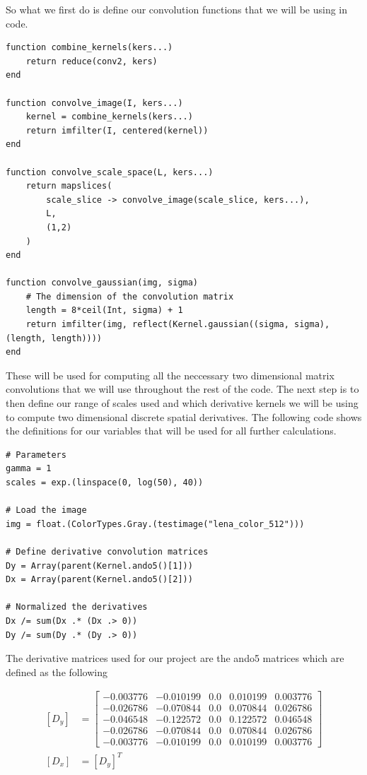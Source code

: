 \documentclass{article}
\begin{document}
So what we first do is define our convolution functions that we will be using in code.

\begin{lstlisting}
function combine_kernels(kers...)
    return reduce(conv2, kers)
end

function convolve_image(I, kers...)
    kernel = combine_kernels(kers...)
    return imfilter(I, centered(kernel))
end

function convolve_scale_space(L, kers...)
    return mapslices(
        scale_slice -> convolve_image(scale_slice, kers...),
        L,
        (1,2)
    )
end

function convolve_gaussian(img, sigma)
    # The dimension of the convolution matrix
    length = 8*ceil(Int, sigma) + 1
    return imfilter(img, reflect(Kernel.gaussian((sigma, sigma), (length, length))))
end
\end{lstlisting}

These will be used for computing all the neccessary two dimensional matrix convolutions that we will use throughout the rest of the code.
The next step is to then define our range of scales used and which derivative kernels we will be using to compute two dimensional discrete spatial derivatives.
The following code shows the definitions for our variables that will be used for all further calculations. 

\begin{lstlisting}
# Parameters
gamma = 1
scales = exp.(linspace(0, log(50), 40))

# Load the image
img = float.(ColorTypes.Gray.(testimage("lena_color_512")))

# Define derivative convolution matrices
Dy = Array(parent(Kernel.ando5()[1]))
Dx = Array(parent(Kernel.ando5()[2]))

# Normalized the derivatives
Dx /= sum(Dx .* (Dx .> 0))
Dy /= sum(Dy .* (Dy .> 0))
\end{lstlisting}

The derivative matrices used for our project are the ando5 matrices which are defined as the following

\begin{equation}
  \begin{aligned}
    [D_y] &=
    \begin{bmatrix}
      -0.003776 &-0.010199  &0.0  &0.010199  &0.003776 \\
      -0.026786 &-0.070844  &0.0  &0.070844  &0.026786 \\
      -0.046548 &-0.122572  &0.0  &0.122572  &0.046548 \\
      -0.026786 &-0.070844  &0.0  &0.070844  &0.026786 \\
      -0.003776 &-0.010199  &0.0  &0.010199  &0.003776
    \end{bmatrix} \\
    [D_x] &= [D_y]^T
  \end{aligned}
\end{equation}
\end{document}
